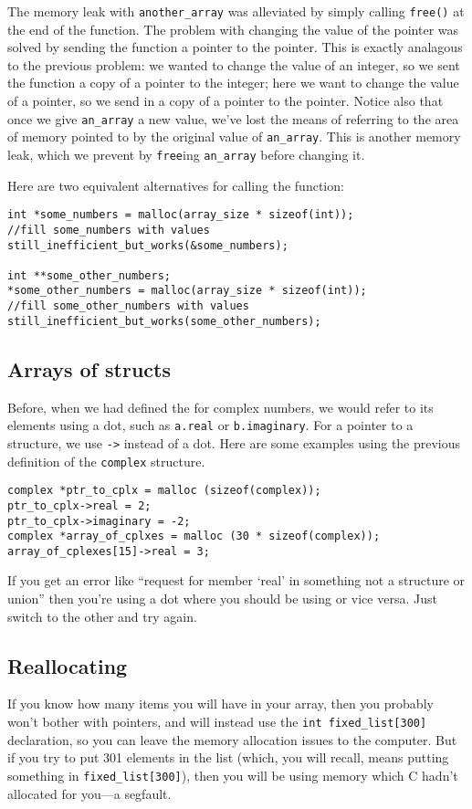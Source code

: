 \documentclass[12pt]{article}
\makeatletter
\def\ttind#1{\index{#1@{\tt #1}}{\tt #1}}
\makeatother
\begin{document}
The memory leak with {\tt another\_array} was alleviated by simply calling {\tt free()} at the end of the
function. The problem with changing the value of the pointer was solved by sending the function a pointer
to the pointer. This is exactly analagous to the previous problem: we wanted to change the value of an
integer, so we sent the function a copy of a pointer to the integer; here we want to change the value of a
pointer, so we send in a copy of a pointer to the pointer. Notice also that once we give {\tt *an\_array}
a new value, we've lost the means of referring to the area of memory pointed to by the original value of
{\tt *an\_array}. This is another memory leak, which we prevent by {\tt free}ing {\tt *an\_array} before
changing it.

Here are two equivalent alternatives for calling the function:
\begin{verbatim}
int *some_numbers = malloc(array_size * sizeof(int));
//fill some_numbers with values
still_inefficient_but_works(&some_numbers);

int **some_other_numbers;
*some_other_numbers = malloc(array_size * sizeof(int));
//fill some_other_numbers with values
still_inefficient_but_works(some_other_numbers);
\end{verbatim}

\subsection{Arrays of structs}	
Before, when we had defined the \ttind{struct} for complex numbers, we would refer to its elements using a
dot, such as {\tt a.real} or {\tt b.imaginary}. For a pointer to a structure, we use {\tt ->} instead of 
a dot.  Here are some examples using the previous definition of the {\tt complex} structure.
\begin{verbatim}
complex *ptr_to_cplx = malloc (sizeof(complex));
ptr_to_cplx->real = 2;
ptr_to_cplx->imaginary = -2;
complex *array_of_cplxes = malloc (30 * sizeof(complex));
array_of_cplexes[15]->real = 3;
\end{verbatim}

If you get an error like ``request for member `real' in something not a structure or union'' then you're
using a dot where you should be using \ttind{->} or vice versa. Just switch to the other and try again.


\subsection{Reallocating} If you know how many items you will have
in your array, then you probably won't bother with pointers, and will
instead use the {\tt int fixed\_list[300]} declaration, so you can leave
the memory allocation issues to the computer. But if you try to put 301
elements in the list (which, you will recall, means putting something
in {\tt fixed\_list[300]}), then you will be using memory which C hadn't
allocated for you---a segfault.
\end{document}
